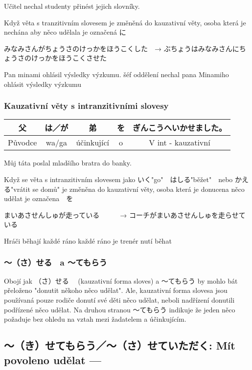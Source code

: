 Učitel nechal studenty přinést jejich slovníky.

Když věta s tranzitivním slovesem je změněná do kauzativní věty, osoba která je nechána aby něco udělala je označená に

みなみさんがちょうさのけっかをほうこくした　→  ぶちょうはみなみさんにちょうさのけっかをほうこくさせた

Pan minami ohlásil výsledky výzkumu.         šéf oddělení nechal pana Minamiho ohlásit výsledky výzkumu


\subsubsection{Kauzativní věty s intranzitivními slovesy}

\begin{center}
\begin{tabular}{||c|c||c|c||c||}
\hline
父&は／が&弟&を&ぎんこうへいかせました。\\
\hline
Původce&wa/ga&účinkující&o&V int - kauzativní\\
\hline
\end{tabular}
\end{center}
Můj táta poslal mladšího bratra do banky. 

Když se věta s intranzitivním slovesem jako いく"go"　はしる"běžet"　nebo かえる"vrátit se domů"  je změněna do kauzativní věty, osoba která je donucena něco udělat je označena　を


まいあさせんしゅが走っている　　　→  コーチがまいあさせんしゅを走らせている

Hráči běhají každé ráno 				každé ráno je trenér nutí běhat 


\subsubsection{〜（さ）せる　a   〜てもらう}
Obojí jak （さ）せる　 (kauzativní forma sloves) a 〜てもらう by mohlo bát přeloženo "donutit někoho něco udělat". Ale, kauzativní forma slovesa jsou používaná pouze rodiče donutí své děti něco udělat, neboli nadřízení donutili podřízené něco udělat. Na druhou stranou 〜てもらう indikuje že jeden něco požaduje bez ohledu na vztah mezi žadatelem a účinkujícím. 


\subsection{〜（き）せてもらう／〜（さ）せていただく: Mít povoleno udělat ---}

